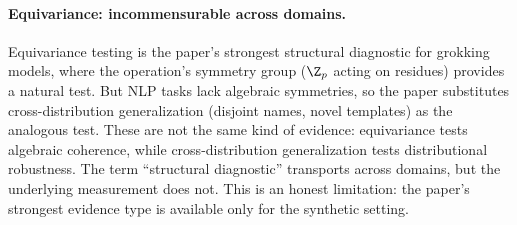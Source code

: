 \paragraph{Equivariance: incommensurable across domains.}
Equivariance testing is the paper's strongest structural diagnostic for
grokking models, where the operation's symmetry group ($\Z_p$ acting on
residues) provides a natural test. But NLP tasks lack algebraic symmetries,
so the paper substitutes cross-distribution generalization (disjoint names,
novel templates) as the analogous test. These are not the same kind of
evidence: equivariance tests algebraic coherence, while cross-distribution
generalization tests distributional robustness. The term ``structural
diagnostic'' transports across domains, but the underlying measurement does
not. This is an honest limitation: the paper's strongest evidence type is
available only for the synthetic setting.
